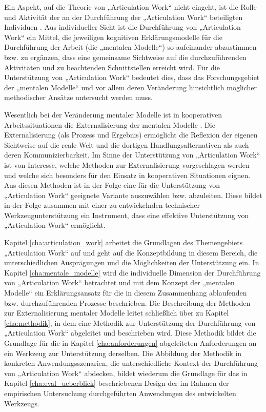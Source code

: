 Ein Aspekt, auf die Theorie von „Articulation Work“ nicht eingeht, ist die Rolle und Aktivität der an der Durchführung der „Articulation Work“ beteiligten Individuen \citep{Strauss93}. Aus individueller Sicht ist die Durchführung von „Articulation Work“ ein Mittel, die jeweiligen kognitiven Erklärungsmodelle für die Durchführung der Arbeit (die „mentalen Modelle“) so aufeinander abzustimmen bzw. zu ergänzen, dass eine gemeinsame Sichtweise auf die durchzuführenden Aktivitäten und zu beachtenden Schnittstellen erreicht wird. Für die Unterstützung von „Articulation Work“ bedeutet dies, dass das Forschungsgebiet der „mentalen Modelle“ und vor allem deren Veränderung hinsichtlich möglicher methodischer Ansätze untersucht werden muss.

Wesentlich bei der Veränderung mentaler Modelle ist in kooperativen Arbeitssituationen die Externalisierung der mentalen Modelle \citep{Seel91}. Die Externalisierung (als Prozess und Ergebnis) ermöglicht die Reflexion der eigenen Sichtweise auf die reale Welt und die dortigen Handlungsalternativen als auch deren Kommunizierbarkeit. Im Sinne der Unterstützung von „Articulation Work“ ist von Interesse, welche Methoden zur Externalisierung vorgeschlagen werden und welche sich besonders für den Einsatz in kooperativen Situationen eignen. Aus diesen Methoden ist in der Folge eine für die Unterstützung von „Articulation Work“ geeignete Variante auszuwählen bzw. abzuleiten. Diese bildet in der Folge zusammen mit einer zu entwickelnden technischer Werkzeugunterstützung ein Instrument, dass eine effektive Unterstützung von „Articulation Work“ ermöglicht. 

Kapitel \ref{cha:articulation_work} arbeitet die Grundlagen des Themengebiets „Articulation Work“ auf und geht auf die Konzeptbildung in diesem Bereich, die unterschiedlichen Ausprägungen und die Möglichkeiten der Unterstützung ein. In Kapitel \ref{cha:mentale_modelle} wird die individuelle Dimension der Durchführung von „Articulation Work“ betrachtet und mit dem Konzept der „mentalen Modelle“ ein Erklärungsansatz für die in diesem Zusammenhang ablaufenden bzw. durchzuführenden Prozesse beschrieben. Die Beschreibung der Methoden zur Externalisierung mentaler Modelle leitet schließlich über zu Kapitel \ref{cha:methodik}, in dem eine Methodik zur Unterstützung der Durchführung von „Articulation Work“ abgeleitet und beschrieben wird. Diese Methodik bildet die Grundlage für die in Kapitel \ref{cha:anforderungen} abgeleiteten Anforderungen an ein Werkzeug zur Unterstützung derselben. Die Abbildung der Methodik in konkreten Anwendungsszenarien, die unterschiedliche Kontext der Durchführung von „Articulation Work“ abdecken, bildet wiederum die Grundlage für das in Kapitel \ref{cha:eval_ueberblick} beschriebenen Design der im Rahmen der empirischen Untersuchung durchgeführten Anwendungen des entwickelten Werkzeugs.






